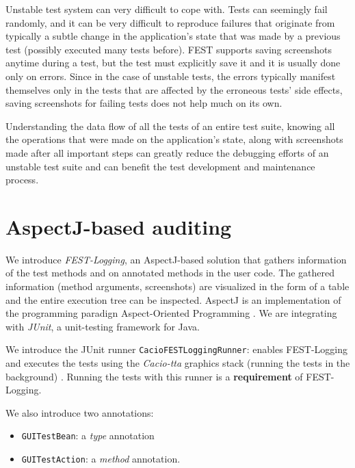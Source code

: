 Unstable test system can very difficult to cope with. Tests can seemingly fail randomly, and it can be very difficult to reproduce failures that originate from typically a subtle change in the application's state that was made by a previous test (possibly executed many tests before). FEST supports saving screenshots anytime during a test, but the test must explicitly save it and it is usually done only on errors. Since in the case of unstable tests, the errors typically manifest themselves only in the tests that are affected by the erroneous tests' side effects, saving screenshots for failing tests does not help much on its own.

Understanding the data flow of all the tests of an entire test suite, knowing all the operations that were made on the application's state, along with screenshots made after all important steps can greatly reduce the debugging efforts of an unstable test suite and can benefit the test development and maintenance process.

\section{AspectJ-based auditing}

We introduce \emph{FEST-Logging}, an AspectJ-based solution that gathers information of the test methods and on annotated methods in the user code. The gathered information (method arguments, screenshots) are visualized in the form of a table and the entire execution tree can be inspected. AspectJ \cite{Colyer:2004:EAA:1407791} is an implementation of the programming paradign Aspect-Oriented Programming \cite{Kiczales97aspect-orientedprogramming}. We are integrating with \emph{JUnit}, a unit-testing framework for Java. \cite{JUnit}

We introduce the JUnit runner \texttt{CacioFESTLoggingRunner}: enables FEST-Logging and executes the tests using the \emph{Cacio-tta} graphics stack (running the tests in the background) \cite{Cacio_Tta_FEST}. Running the tests with this runner is a \textbf{requirement} of FEST-Logging.

We also introduce two annotations:
\begin{itemize}
\item \texttt{GUITestBean}: a \emph{type} annotation
\item \texttt{GUITestAction}: a \emph{method} annotation.
\end{itemize}

